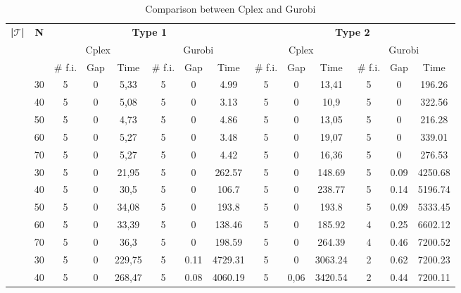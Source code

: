  
 


 
\begin{table}[!h]
\caption{Comparison between Cplex and Gurobi}
\centering
\tiny
\begin{tabular}{|c|c|c c c c c c|c c c c c c|}
\hline
\multirow{3}{*}{\textbf{|$\mathcal{T}$|}} & \multirow{3}{*}{\textbf{N}} & \multicolumn{6}{|c|}{\textbf{Type 1}} & \multicolumn{6}{|c|}{\textbf{Type 2}}\\
& & \multicolumn{3}{c|}{Cplex} & \multicolumn{3}{c|}{Gurobi} & \multicolumn{3}{c|}{Cplex} & \multicolumn{3}{c|}{Gurobi} \\
& & \# f.i. & Gap & Time & \# f.i. & Gap & Time & \# f.i. & Gap & Time & \# f.i. & Gap & Time\\
\hline
\multirow{5}{*}{\midrule 5} 
& 30 & 5 & 0 & 5,33 & 5 & 0 & 4.99 & 5 & 0 & 13,41 & 5 & 0 & 196.26\\
& 40 & 5 & 0 & 5,08 & 5 & 0 & 3.13 & 5 & 0 & 10,9 &  5 & 0 & 322.56\\
& 50 & 5 & 0 & 4,73 & 5 & 0 & 4.86 & 5 & 0 & 13,05 & 5 & 0 & 216.28\\
& 60 & 5 & 0 & 5,27 & 5 & 0 & 3.48 & 5 & 0 & 19,07 & 5 & 0 & 339.01\\
& 70 & 5 & 0 & 5,27 & 5 & 0 & 4.42 & 5 & 0 & 16,36 & 5 & 0 & 276.53\\
\hline
\multirow{5}{*}{\midrule 6} 
& 30 & 5 & 0 &  21,95 & 5 & 0 & 262.57 & 5 & 0 & 148.69 & 5 & 0.09 & 4250.68\\
& 40 & 5 & 0 &  30,5 & 5 & 0 & 106.7 &  5  & 0 & 238.77 &	5 &	0.14 &	5196.74\\
& 50 & 5 & 0 &	34,08 & 5 &	0 &	193.8 &  5 & 0 & 193.8  & 5 & 0.09 &	5333.45\\
& 60 & 5 & 0 &	33,39 &	5 &	0 &	138.46 & 5 & 0 & 185.92 & 4 & 0.25 &	6602.12\\
& 70 & 5 & 0 &	36,3 &	5 &	0 &	198.59 & 5 & 0 & 264.39 & 4 & 0.46 &	7200.52\\
\hline
\multirow{5}{*}{\midrule 7} 
& 30 &	5 &	0 &	229,75 & 5 & 0.11 &	4729.31 & 5 & 0    & 3063.24 & 2 &	0.62 &	7200.23\\
& 40 &	5 &	0 &	268,47 & 5 & 0.08 &	4060.19 & 5 & 0,06 & 3420.54 & 2 & 0.44 & 7200.11\\

\end{tabular}
\end{table}

